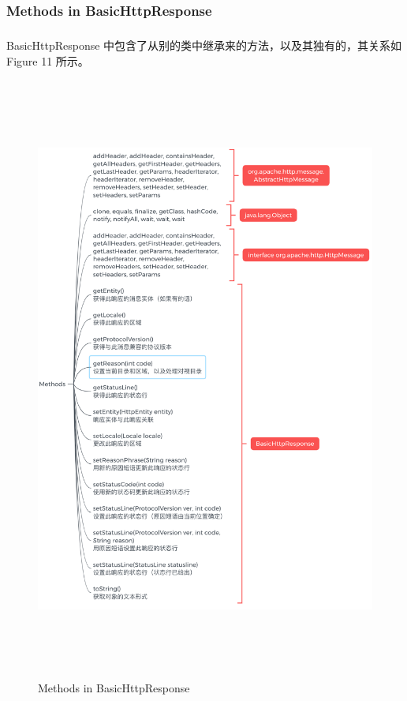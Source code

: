 \documentclass{article}
\begin{document}
	\subsubsection{Methods in BasicHttpResponse}
	\begin{CJK}{UTF8}{gbsn}
		\subparagraph{}
		BasicHttpResponse 中包含了从别的类中继承来的方法，以及其独有的，其关系如 Figure 11 所示。
	\end{CJK}{}
	\begin{figure}[H]
		\centering
		\includegraphics[height = 20cm, width = 16cm]{pics/21_BasicHttpResponse.png}	
		\caption{Methods in BasicHttpResponse}
	\end{figure}
\end{document}
